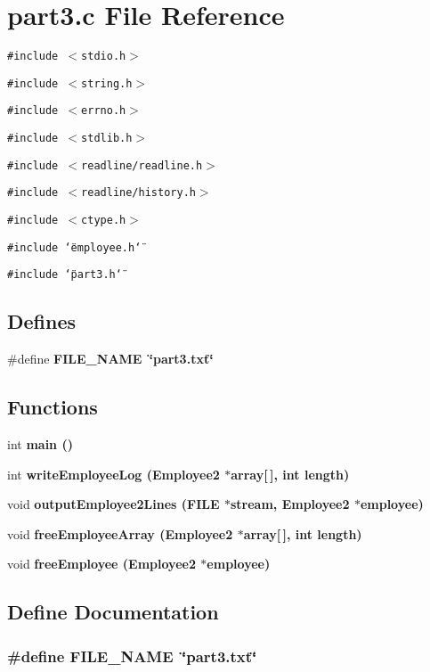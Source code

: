 \section{part3.c File Reference}
\label{part3_8c}
{\tt \#include $<$stdio.h$>$}\par
{\tt \#include $<$string.h$>$}\par
{\tt \#include $<$errno.h$>$}\par
{\tt \#include $<$stdlib.h$>$}\par
{\tt \#include $<$readline/readline.h$>$}\par
{\tt \#include $<$readline/history.h$>$}\par
{\tt \#include $<$ctype.h$>$}\par
{\tt \#include \char`\"{}employee.h\char`\"{}}\par
{\tt \#include \char`\"{}part3.h\char`\"{}}\par
\subsection*{Defines}
\begin{CompactItemize}
\item 
\#define \bf{FILE\_\-NAME}~\char`\"{}part3.txt\char`\"{}
\end{CompactItemize}
\subsection*{Functions}
\begin{CompactItemize}
\item 
int \bf{main} ()
\item 
int \bf{write\-Employee\-Log} (\bf{Employee2} $\ast$array[$\,$], int length)
\item 
void \bf{output\-Employee2Lines} (FILE $\ast$stream, \bf{Employee2} $\ast$employee)
\item 
void \bf{free\-Employee\-Array} (\bf{Employee2} $\ast$array[$\,$], int length)
\item 
void \bf{free\-Employee} (\bf{Employee2} $\ast$employee)
\end{CompactItemize}


\subsection{Define Documentation}
\subsubsection{\setlength{\rightskip}{0pt plus 5cm}\#define FILE\_\-NAME~\char`\"{}part3.txt\char`\"{}}\label{part3_8c_b117546549783a058d0321a287699579}




